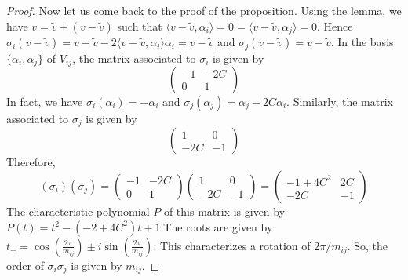 \documentclass[envcountsame,envcountchap]{svmono}
\begin{document}
\begin{proof}
Now let us come back to the proof of the proposition. Using the lemma, we have $v = \tilde{v} + (v- \tilde{v})$ such that $\langle v - \tilde{v} , \alpha_i \rangle = 0 = \langle v - \tilde{v}, \alpha_j \rangle = 0$. Hence $\sigma_i (v - \tilde{v}) = v- \tilde{v} - 2 \langle v - \tilde{v} , \alpha_i \rangle \alpha_i = v- \tilde{v}$ and $\sigma_j (v-\tilde{v}) = v - \tilde{v}$. In the basis $\{ \alpha_i, \alpha_j \}$ of $V_{ij}$, the matrix associated to $\sigma_i$ is given by
\begin{equation}
\begin{pmatrix}
-1 &-2 C \\
0 & 1
\end{pmatrix}
\end{equation} In fact, we have $\sigma_i (\alpha_i) = -\alpha_i$ and $\sigma_j (\alpha_j ) = \alpha_j - 2 C \alpha_i$. Similarly, the matrix associated to $\sigma_j$ is given by
\begin{equation}
\begin{pmatrix}
1 & 0 \\
-2C & -1
\end{pmatrix}
\end{equation} Therefore,
\begin{equation}
(\sigma_i) (\sigma_j) = \begin{pmatrix}
-1 &-2 C \\
0 & 1
\end{pmatrix} \begin{pmatrix}
1 & 0 \\
-2C & -1
\end{pmatrix} = \begin{pmatrix}
-1 + 4 C^2 & 2C \\
-2 C & -1
\end{pmatrix}
\end{equation} The characteristic polynomial $P$ of this matrix is given by $P(t) = t^2 - (-2 + 4 C^2 ) t + 1$.The roots are given by $t_\pm = \cos \left(\frac{2 \pi}{m_{ij}} \right) \pm i \sin \left( \frac{2 \pi}{m_{ij}} \right)$. This characterizes a rotation of $2 \pi / m_{ij}$. So, the order of $\sigma_i \sigma_j$ is given by $m_{ij}$. 


 
 
\end{proof}
  
	
\end{document}

